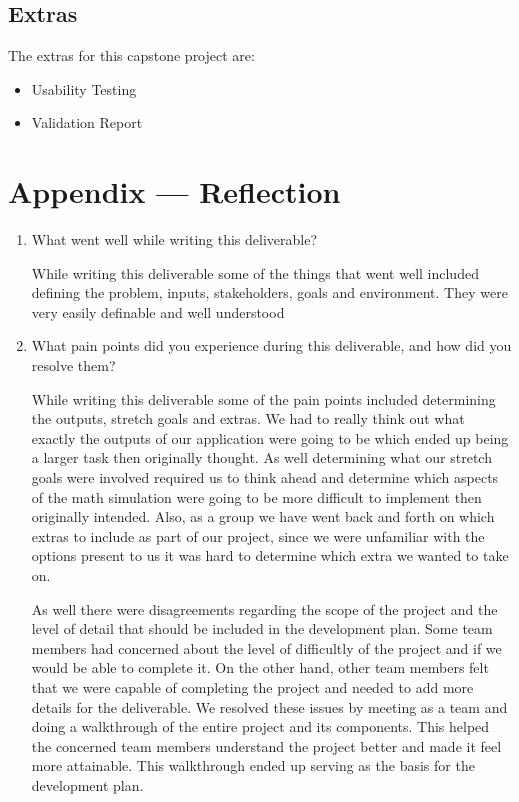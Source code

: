 \documentclass{article}
\begin{document}
\subsection{Extras}
The extras for this capstone project are:
\begin{itemize}
    \item Usability Testing
    \item Validation Report
\end{itemize}


\newpage{}

\section*{Appendix --- Reflection}



\begin{enumerate}
    \item What went well while writing this deliverable? 

    While writing this deliverable some of the things that went well included
    defining the problem, inputs, stakeholders, goals and environment. They
    were very easily definable and well understood
    
    \item What pain points did you experience during this deliverable, and how
    did you resolve them?

    While writing this deliverable some of the pain points included determining the outputs, stretch goals and extras. We had to really think out
    what exactly the outputs of our application were going to be which ended
    up being a larger task then originally thought. As well determining what
    our stretch goals were involved required us to think ahead and determine
    which aspects of the math simulation were going to be more difficult to
    implement then originally intended. Also, as a group we have went back
    and forth on which extras to include as part of our project, since we were
    unfamiliar with the options present to us it was hard to determine which
    extra we wanted to take on.

    As well there were disagreements regarding the scope of the project and the level of detail that should be included in the development plan. 
    Some team members had concerned about the level of difficultly of the project and if we would be able to complete it. On the other hand,
    other team members felt that we were capable of completing the project and needed to add more details for the deliverable.
    We resolved these issues by meeting as a team and doing a walkthrough of the entire project and its components.
    This helped the concerned team members understand the project better and made it feel more attainable. 
    This walkthrough ended up serving as the basis for the development plan.
    

\end{enumerate}
\end{document}
